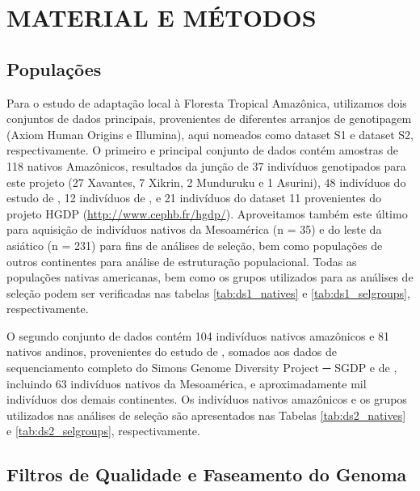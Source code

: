 \clearpage
\section{MATERIAL E MÉTODOS} 

\subsection{Populações}

Para o estudo de adaptação local à Floresta Tropical Amazônica, utilizamos dois conjuntos de dados principais, provenientes de diferentes arranjos de genotipagem (Axiom Human Origins e Illumina), aqui nomeados como dataset S1 e dataset S2, respectivamente. O primeiro e principal conjunto de dados contém amostras de 118 nativos Amazônicos, resultados da junção de 37 indivíduos genotipados para este projeto (27 Xavantes, 7 Xikrin, 2 Munduruku e 1 Asurini), 48 indivíduos do estudo de \cite{skoglund_genetic_2015},  12 indivíduos de \cite{castro_e_silva_genomic_2020}, e 21 indivíduos do dataset 11 provenientes do projeto HGDP (\url{http://www.cephb.fr/hgdp/}). Aproveitamos também este último para aquisição de indivíduos nativos da Mesoamérica (n = 35) e do leste da asiático (n = 231) para fins de análises de seleção, bem como populações de outros continentes para análise de estruturação populacional. Todas as populações nativas americanas, bem como os grupos utilizados para as análises de seleção podem ser verificadas nas tabelas \ref{tab:ds1_natives} e \ref{tab:ds1_selgroups}, respectivamente.

O segundo conjunto de dados contém 104 indivíduos nativos amazônicos e 81 nativos andinos, provenientes do estudo de , somados aos dados de sequenciamento completo do Simons Genome Diversity Project ─ SGDP \cite{mallick_simons_2016} e de , incluindo 63 indivíduos nativos da Mesoamérica, e aproximadamente mil indivíduos dos demais continentes. Os indivíduos nativos amazônicos e os grupos utilizados nas análises de seleção são apresentados nas Tabelas \ref{tab:ds2_natives} e \ref{tab:ds2_selgroups}, respectivamente.

\subsection{Filtros de Qualidade e Faseamento do Genoma}

